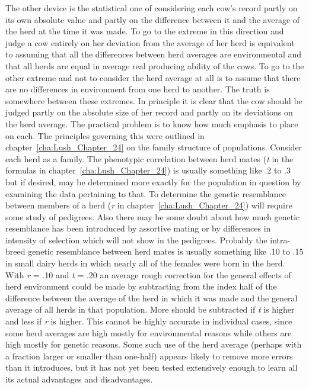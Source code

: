 The other device is the statistical one of considering each cow's
record partly on its own absolute value and partly on the difference
between it and the average of the herd at the time it was made. To go to
the extreme in this direction and judge a cow entirely on her deviation
from the average of her herd is equivalent to assuming that all the differences
between herd averages are environmental and that all herds are
equal in average real producing ability of the cows. To go to the other
extreme and not to consider the herd average at all is to assume that
there are no differences in environment from one herd to another. The
truth is somewhere between these extremes. In principle it is clear that
the cow should be judged partly on the absolute size of her record and
partly on its deviations on the herd average. The practical problem is
to know how much emphasis to place on each. The principles governing
this were outlined in chapter~\ref{cha:Lush_Chapter_24} on the family
structure of populations. Consider each herd as a family. The phenotypic
correlation between herd mates (\textit{t} in the formulas in
chapter~\ref{cha:Lush_Chapter_24}) is usually something like .2 to .3
but if desired, may be determined more exactly for the population in
question by examining the data pertaining to that. To determine the
genetic resemblance between members of a herd (\textit{r} in
chapter~\ref{cha:Lush_Chapter_24}) will require some study of pedigrees.
Also there may be some doubt about how much genetic resemblance has been
introduced by assortive mating or by differences in intensity of selection
which will not show in the pedigrees. Probably the intra-breed genetic
resemblance between herd mates is usually something like .10 to .15 in
small dairy herds in which nearly all of the females were born in the
herd. With \textit{r} = .10 and \textit{t} = .20 an average rough
correction for the general effects of herd environment could be made by
subtracting from the index half of the difference between the average
of the herd in which it was made and the general average of all herds
in that population. More should be subtracted if \textit{t} is higher
and less if \textit{r} is higher. This cannot be highly accurate in
individual cases, since some herd averages are high mostly for
environmental reasons while others are high mostly for genetic reasons.
Some such use of the herd average (perhaps with a fraction larger
or smaller than one-half) appears likely to remove more errors than it
introduces, but it has not yet been tested extensively enough to learn all
its actual advantages and disadvantages.

